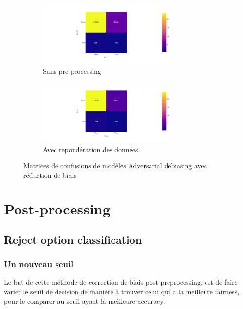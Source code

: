 \documentclass{article}
\begin{document}
    \begin{figure}[h]
        \centering
        \begin{subfigure}{7cm}
            \includegraphics[width=7cm]{./img/adversarial1_conf_matrix.png}
            \caption{Sans pre-processing}\label{fig:ADV_matrix1}
        \end{subfigure}
        \hspace{0.2cm}
        \begin{subfigure}{7cm}
            \includegraphics[width=7cm]{./img/adversarial2_conf_matrix.png}
        \caption{Avec repondération des données}\label{fig:ADV_matrix2}
        \end{subfigure}
        \caption{Matrices de confusions de modèles Adversarial debiasing avec réduction de biais}
    \end{figure}
    \vspace{2cm}


    \section{Post-processing}

    \subsection{Reject option classification}
    \subsubsection{Un nouveau seuil}

    Le but de cette méthode de correction de biais post-preprocessing, est de faire varier le seuil de décision de manière à 
    trouver celui qui a la meilleure fairness, pour le comparer au seuil ayant la meilleure accuracy.
\end{document}
